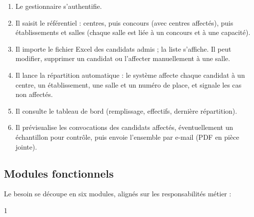 \begin{onehalfspace}
\begin{enumerate}
  \item Le gestionnaire s'authentifie.
  \item Il saisit le référentiel : centres, puis concours (avec centres affectés), puis établissements et salles (chaque salle est liée à un concours et à une capacité).
  \item Il importe le fichier Excel des candidats admis ; la liste s'affiche. Il peut modifier, supprimer un candidat ou l'affecter manuellement à une salle.
  \item Il lance la répartition automatique : le système affecte chaque candidat à un centre, un établissement, une salle et un numéro de place, et signale les cas non affectés.
  \item Il consulte le tableau de bord (remplissage, effectifs, dernière répartition).
  \item Il prévisualise les convocations des candidats affectés, éventuellement un échantillon pour contrôle, puis envoie l'ensemble par e-mail (PDF en pièce jointe).
\end{enumerate}

\subsection{Modules fonctionnels}

Le besoin se découpe en six modules, alignés sur les responsabilités métier :

\begin{table}[H]
\centering
\caption{Modules fonctionnels de la plateforme}
\label{tab:modules}
\begin{spacing}{1}
\end{spacing}
\end{table}


\end{onehalfspace}
